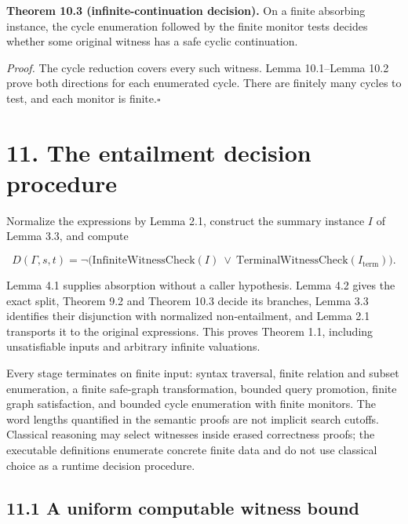 \documentclass[
  11pt,
  a4paper,
]{article}
\begin{document}

\textbf{Theorem 10.3 (infinite-continuation decision).} On a finite
absorbing instance, the cycle enumeration followed by the finite monitor
tests decides whether some original witness has a safe cyclic
continuation.

\emph{Proof.} The cycle reduction covers every such witness. Lemma
10.1--Lemma 10.2 prove both directions for each enumerated cycle. There
are finitely many cycles to test, and each monitor is
finite.\nobreak\hspace{.5em}\(\square\)


\section{11. The entailment decision
procedure}\label{the-entailment-decision-procedure}

Normalize the expressions by Lemma 2.1, construct the summary instance
\(I\) of Lemma 3.3, and compute

\[D(\Gamma,s,t)=\neg\bigl(
\mathrm{InfiniteWitnessCheck}(I)\ \lor\
\mathrm{TerminalWitnessCheck}(I_{\mathrm{term}})\bigr).\tag{11.1}\]

Lemma 4.1 supplies absorption without a caller hypothesis. Lemma 4.2
gives the exact split, Theorem 9.2 and Theorem 10.3 decide its branches,
Lemma 3.3 identifies their disjunction with normalized non-entailment,
and Lemma 2.1 transports it to the original expressions. This proves
Theorem 1.1, including unsatisfiable inputs and arbitrary infinite
valuations.

Every stage terminates on finite input: syntax traversal, finite
relation and subset enumeration, a finite safe-graph transformation,
bounded query promotion, finite graph satisfaction, and bounded cycle
enumeration with finite monitors. The word lengths quantified in the
semantic proofs are not implicit search cutoffs. Classical reasoning may
select witnesses inside erased correctness proofs; the executable
definitions enumerate concrete finite data and do not use classical
choice as a runtime decision procedure.

\subsection{11.1 A uniform computable witness
bound}\label{a-uniform-computable-witness-bound}

\end{document}
